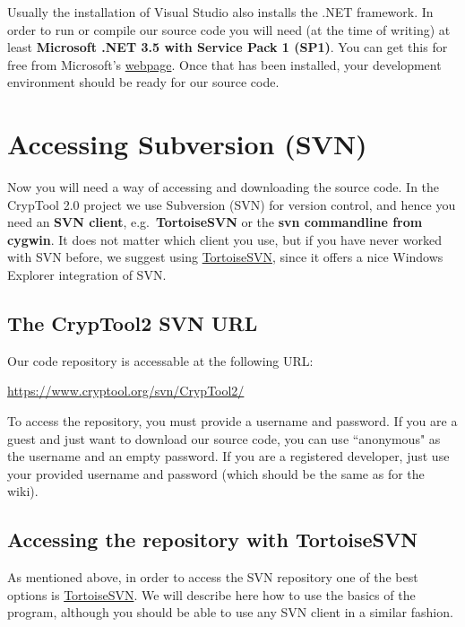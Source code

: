 Usually the installation of Visual Studio also installs the .NET framework. In order to run or compile our source code you will need (at the time of writing) at least \textbf{Microsoft .NET 3.5 with Service Pack 1 (SP1)}. You can get this for free from Microsoft's \href{http://download.microsoft.com/download/2/0/e/20e90413-712f-438c-988e-fdaa79a8ac3d/dotnetfx35.exe}{webpage}. Once that has been installed, your development environment should be ready for our source code.

\section{Accessing Subversion (SVN)}
\label{AccessingSubversion}

Now you will need a way of accessing and downloading the source code. In the CrypTool 2.0 project we use Subversion (SVN) for version control, and hence you need an \textbf{SVN client}, e.g.\ \textbf{TortoiseSVN} or the \textbf{svn commandline from cygwin}. It does not matter which client you use, but if you have never worked with SVN before, we suggest using \href{http://www.tortoisesvn.net/}{TortoiseSVN}, since it offers a nice Windows Explorer integration of SVN.

\subsection*{The CrypTool2 SVN URL}
\label{TheCrypTool2SVNURL}

Our code repository is accessable at the following URL:

\url{https://www.cryptool.org/svn/CrypTool2/}

To access the repository, you must provide a username and password. If you are a guest and just want to download our source code, you can use ``anonymous" as the username and an empty password. If you are a registered developer, just use your provided username and password (which should be the same as for the wiki).

\subsection*{Accessing the repository with TortoiseSVN}
\label{AccessingTheRepositoryWithTortoiseSVN}

As mentioned above, in order to access the SVN repository one of the best options is \href{http://www.tortoisesvn.net/}{TortoiseSVN}. We will describe here how to use the basics of the program, although you should be able to use any SVN client in a similar fashion.

